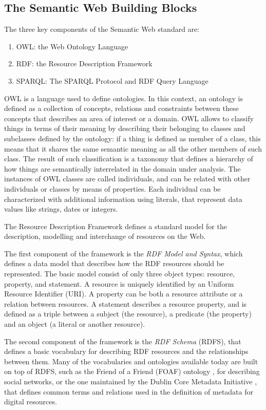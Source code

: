 \documentclass[%
    corpo=13.5pt,
    twoside,
    oldstyle,
    tipotesi=magistrale,
    greek,
    evenboxes
]{toptesi}
\begin{document}
\subsection{The Semantic Web Building Blocks}
\label{subsec:semanticweb}

The three key components of the Semantic Web standard are:
\begin{enumerate}
\item OWL: the Web Ontology Language\cite{mcguinness2004}
\item RDF: the Resource Description Framework\cite{lassila1998}
\item SPARQL: The SPARQL Protocol and RDF Query Language\cite{ducharme2013}
\end{enumerate}
\bigskip

OWL is a language used to define ontologies. In this context, an ontology
is defined as a collection of concepts, relations and constraints between
these concepts that describes an area of interest or a domain.
OWL allows to classify things in terms of their meaning by describing
their belonging to classes and subclasses defined by the ontology: if
a thing is defined as member of a class, this means that it shares the
same semantic meaning as all the other members of such class. The result of
such classification is a taxonomy that defines a hierarchy of how things
are semantically interrelated in the domain under analysis.
The instances of OWL classes are called individuals, and can be related
with other individuals or classes by means of properties. Each individual
can be characterized with additional information using literals, that
represent data values like strings, dates or integers.
\newline

The Resource Description Framework defines a standard model for the
description, modelling and interchange of resources on the Web.

The first component of the framework is the \emph{RDF Model and Syntax},
which defines a data model that describes how the RDF resources should be
represented. The basic model consist of only three object types: resource,
property, and statement.
A resource is uniquely identified by an Uniform Resource Identifier (URI).
A property can be both a resource attribute or a relation between resources.
A statement describes a resource property, and is defined as a triple
between a subject (the resource), a predicate (the property) and an
object (a literal or another resource).

The second component of the framework is the \emph{RDF Schema} (RDFS),
that defines a basic vocabulary for describing RDF resources and the
relationships between them. Many of the vocabularies and ontologies available
today are built on top of RDFS, such as the Friend of a Friend (FOAF)
ontology \cite{brickley2007}, for describing social networks, or the one
maintained by the Dublin Core Metadata Initiative \cite{weibel1998}, that
defines common terms and relations used in the definition of metadata for
digital resources.
\end{document}
